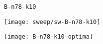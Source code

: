 \begin{figure}[H]
	\begin{minipage}{0.15\textwidth}
		\centering
		\texttt{B-n78-k10}
	\end{minipage}%
	\begin{minipage}{0.40\textwidth}
		\centering
		\texttt{[image: sweep/sw-B-n78-k10]}\par
	\end{minipage}%
	\hspace{0.03\textwidth}
	\begin{minipage}{0.40\textwidth}
		\centering
		\texttt{[image: B-n78-k10-optima]}\par
	\end{minipage}%
\end{figure}
